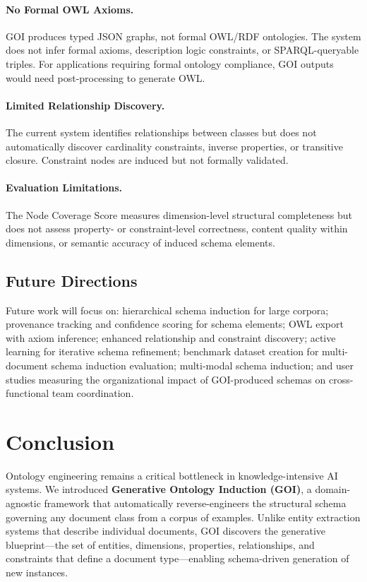 \documentclass[runningheads,a4paper]{llncs}
\begin{document}
\paragraph{No Formal OWL Axioms.} GOI produces typed JSON graphs, not
formal OWL/RDF ontologies. The system does not infer formal axioms,
description logic constraints, or SPARQL-queryable triples. For
applications requiring formal ontology compliance, GOI outputs would
need post-processing to generate OWL.

\paragraph{Limited Relationship Discovery.} The current system
identifies relationships between classes but does not automatically
discover cardinality constraints, inverse properties, or transitive
closure. Constraint nodes are induced but not formally validated.

\paragraph{Evaluation Limitations.} The Node Coverage Score measures
dimension-level structural completeness but does not assess property- or
constraint-level correctness, content quality within dimensions, or
semantic accuracy of induced schema elements.

\subsection{Future Directions}

Future work will focus on: hierarchical schema induction for large
corpora; provenance tracking and confidence scoring for schema elements;
OWL export with axiom inference; enhanced relationship and constraint
discovery; active learning for iterative schema refinement; benchmark
dataset creation for multi-document schema induction evaluation;
multi-modal schema induction; and user studies measuring the
organizational impact of GOI-produced schemas on cross-functional team
coordination.

\section{Conclusion}
\label{sec:conclusion}

Ontology engineering remains a critical bottleneck in knowledge-intensive
AI systems. We introduced \textbf{Generative Ontology Induction (GOI)},
a domain-agnostic framework that automatically reverse-engineers the
structural schema governing any document class from a corpus of examples.
Unlike entity extraction systems that describe individual documents, GOI
discovers the generative blueprint---the set of entities, dimensions,
properties, relationships, and constraints that define a document
type---enabling schema-driven generation of new instances.
\end{document}
